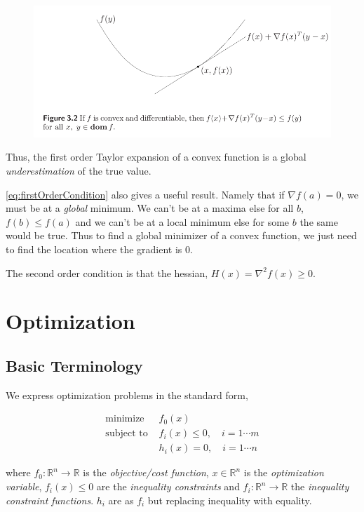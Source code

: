 \documentclass{article}
\begin{document}
\begin{figure}[h!]
    \centering
    \includegraphics[width=1\textwidth]{./figures/ConvexFunctionGrad.png}
    \label{fig:convexFunctionGrad}
\end{figure}

\noindent
Thus, the first order Taylor expansion of a convex function is a global {\em underestimation\/} of the true value.

\autoref{eq:firstOrderCondition} also gives a useful result. Namely that if $\nabla f(a) = 0$, we must be at a {\em global\/} minimum.
We can't be at a maxima else for all $b$, $f(b) \leq f(a)$ and we can't be at a local minimum else for some $b$ the same would be true.
Thus to find a global minimizer of a convex function, we just need to find the location where the gradient is 0.

The second order condition is that the hessian, $H(x) = \nabla^2 f(x) \geq 0$.

\section{Optimization}

\subsection{Basic Terminology}

We express optimization problems in the standard form,

\begin{align}
    \text{minimize }   & f_0(x)                             \\
    \text{subject to } & f_i(x) \le 0, \quad i = 1 \cdots m \\
                       & h_i(x) = 0, \quad i = 1 \cdots n
\end{align}

\noindent
where
$f_0: \mathbb{R}^n \rightarrow \mathbb{R}$ is the {\em objective/cost function\/},
$x \in \mathbb{R}^n$ is the {\em optimization variable\/},
$f_i(x) \le 0$ are the {\em inequality constraints} and $f_i: \mathbb{R}^n \rightarrow \mathbb{R}$ the {\em inequality constraint functions}.
$h_i$ are as $f_i$ but replacing inequality with equality.
\end{document}
